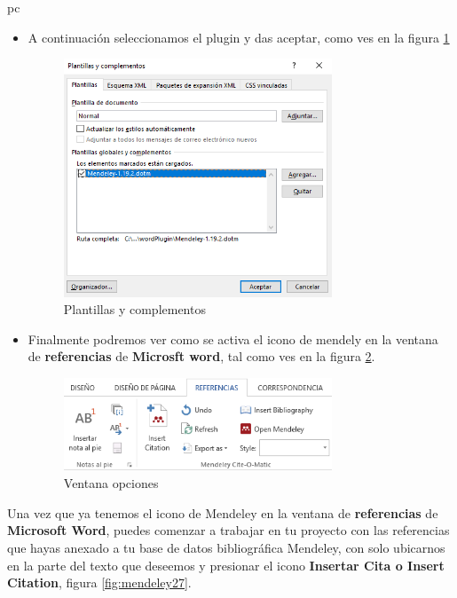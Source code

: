 pc\documentclass[a4paper,12pt,openany]{book}
\begin{document}
\begin{itemize}
\begin{enumerate}
\begin{itemize}
        \item A continuación seleccionamos el plugin y das aceptar, como ves en la figura \ref{fig:mendeley25}
        
        \begin{figure}[H]
        \centering
    	\includegraphics[width=8cm]{mendeley22.png}
        \caption{Plantillas y complementos}
        \label{fig:mendeley25}
        \end{figure}

        \item Finalmente podremos ver como se activa el icono de mendely en la ventana de \textbf{referencias} de \textbf{Microsft word}, tal como ves en la figura \ref{fig:mendeley26}.
        
        \begin{figure}[H]
        \centering
    	\includegraphics[width=8cm]{mendeley23.png}
        \caption{Ventana opciones}
        \label{fig:mendeley26}
        \end{figure}
      
    \end{itemize}
\end{enumerate}

Una vez que ya tenemos el icono de Mendeley en la ventana de \textbf{referencias} de \textbf{Microsoft Word}, puedes comenzar a trabajar en tu proyecto con las referencias que hayas anexado a tu base de datos bibliográfica Mendeley, con solo ubicarnos en la parte del texto que deseemos y presionar el icono \textbf{Insertar Cita o Insert Citation}, figura \ref{fig:mendeley27}.


\end{itemize}
\end{document}
